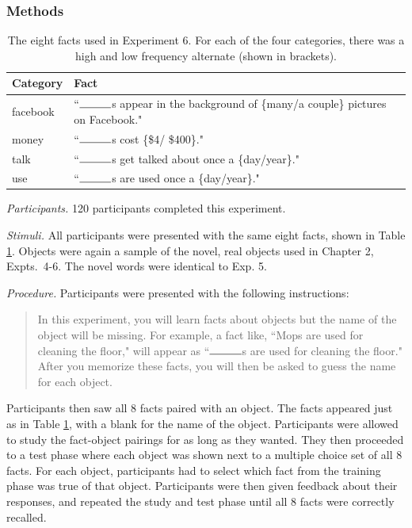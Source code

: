 \subsubsection{Methods}

\begin{table}[t!]
\centering

\begin{tabular}{ll}
\toprule
\textbf{Category} & \textbf{Fact}               \\
\toprule
   facebook & ``$\rule{1cm}{0.15mm}$s appear in the background of \{many/a couple\} pictures on Facebook."\\
   money  &  ``$\rule{1cm}{0.15mm}$s cost \{\$4/ \$400\}."   \\
   talk  & ``$\rule{1cm}{0.15mm}$s get talked about once a \{day/year\}." \\
   use    & ``$\rule{1cm}{0.15mm}$s are used once a \{day/year\}."                             \\

 \bottomrule
\end{tabular}
\caption{The eight facts used in Experiment 6. For each of the four categories, there was a high and low frequency alternate (shown in  brackets).}
\label{tab:facts}
\end{table}

{\it Participants.} 
120 participants completed this experiment. 

{\it Stimuli.} 
All participants were presented with the same eight facts, shown in Table \ref{tab:facts}. Objects were again a sample of the novel, real objects used in Chapter 2, Expts.\ 4-6.  The novel words were identical to Exp. 5.

{\it Procedure.} 
Participants were presented with the following instructions:

\begin{quote}
In this experiment, you will learn facts about objects but the name of the object will be missing. For example, a fact like, ``Mops are used for cleaning the floor," will appear as ``$\rule{1cm}{0.15mm}$s are used for cleaning the floor." After you memorize these facts, you will then be asked to guess the name for each object. 
\end{quote}
Participants  then saw  all 8 facts paired with an object. The facts appeared just as in  Table \ref{tab:facts}, with a blank for the name of the object. Participants were allowed to study the fact-object pairings for as long as they wanted. They then proceeded to a test phase where  each object was shown next to a multiple choice set of all 8 facts. For each object, participants had to select which fact from the training phase was true of that object. Participants were then given feedback about their responses, and repeated the study and test phase until all 8 facts were correctly recalled. 

